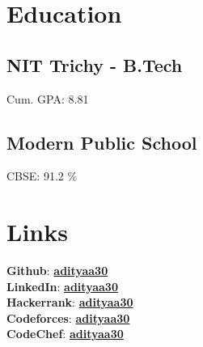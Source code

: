\documentclass[]{deedy-resume-openfont}
\begin{document}
\lastupdated



\begin{minipage}[t]{0.30\textwidth}

\section{Education}

\subsection{NIT Trichy - B.Tech}
Cum. GPA: 8.81 \\
\sectionsep

\subsection{Modern Public School}
CBSE: 91.2 \% \\


\section{Links}
\textbf{Github}: \href{https://github.com/adityaa30}{\textbf{adityaa30}} \\
\textbf{LinkedIn}: \href{https://www.linkedin.com/in/adityaa30/}{\textbf{adityaa30}} \\
\textbf{Hackerrank}: \href{https://www.hackerrank.com/adityaa30?hr_r=1}{\textbf{adityaa30}} \\
\textbf{Codeforces}: \href{https://codeforces.com/profile/adityaa30}{\textbf{adityaa30}} \\
\textbf{CodeChef}: \href{https://www.codechef.com/users/adityaa30}{\textbf{adityaa30}}


\end{minipage}
\end{document}
